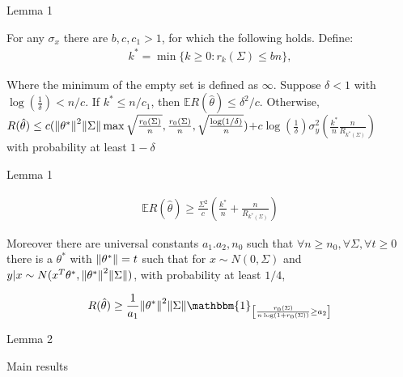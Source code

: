 \documentclass{beamer}
\begin{document}
\begin{frame}{Lemma 1}
	
For any $\sigma_x$ there are $b,c,c_1 > 1$, for which the following holds.
Define:
\begin{align*}
k^* = \min \{k \geq 0: r_k(\Sigma) \leq bn\},
\end{align*}
	
Where the minimum of the empty set is defined as $\infty$. Suppose $\delta < 1$ with $\log(\frac{1}{\delta}) < n/c$. If $k^* \leq n/c_1$, then $\mathbb{E}R(\hat{\theta}) \leq \delta^2/c.$ Otherwise,\\
	
	
$R(\hat{\theta}) \leq c(\norm{\theta^*}^2\norm{\Sigma}\max{\sqrt{\frac{r_0(\Sigma)}{n}},\frac{r_0(\Sigma)}{n},\sqrt{\frac{\log(1/\delta)}{n}}}) 
$\newline \hspace*{0.85 cm}$+ c\log(\frac{1}{\delta})\sigma_y^2\left(\frac{k^*}{n} \frac{n}{R_{k^*(\Sigma)}}\right)$\\

with probability at least $1 - \delta$

\end{frame}


\begin{frame}{Lemma 1}

\begin{align*}
	\mathbb{E}R(\hat{\theta}) \geq \frac{\Sigma^2}{c} \left(\frac{k^*}{n} + \frac{n}{R_{k^*(\Sigma)}}\right)
\end{align*}


Moreover there are universal constants $a_1.a_2,n_0$ such that $\forall n \geq n_0, \forall \Sigma, \forall t \geq 0$ there is a $\theta^*$ with $\norm{\theta^*} = t$ such that for $x \sim N(0,\Sigma)$ and $y|x \sim N(x^T\theta^*,\norm{\theta^*}^2\norm{\Sigma})$, with probability at least $1/4$,
	

\begin{align*}
	R(\hat{\theta})\geq \frac{1}{a_1}\norm{\theta^*}^2\norm{\Sigma}\mathbbm{1}_{\left[\frac{r_0(\Sigma)}{n\log(1+r_0(\Sigma))} \geq a_2\right]}
\end{align*}
\end{frame}


\begin{frame}{Lemma 2}

\end{frame}


\begin{frame}{Main results}
\begin{center}
	
\end{center}
\end{frame}
\end{document}
